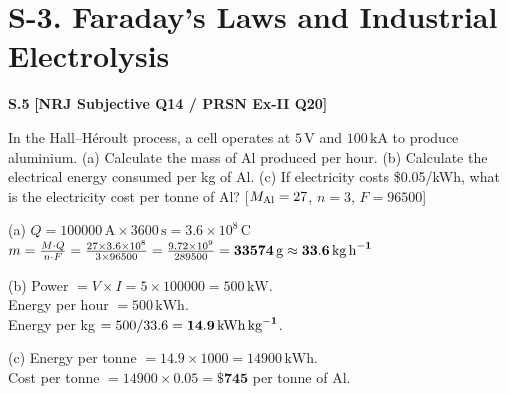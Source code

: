 \section*{S-3. Faraday's Laws and Industrial Electrolysis}

\begin{problembox}
\textbf{S.5} \hfill \textbf{[NRJ Subjective Q14 / PRSN Ex-II Q20]}

In the Hall--H\'{e}roult process, a cell operates at $5\,\text{V}$ and $100\,\text{kA}$ to produce aluminium. (a) Calculate the mass of Al produced per hour. (b) Calculate the electrical energy consumed per kg of Al. (c) If electricity costs \$0.05/kWh, what is the electricity cost per tonne of Al? [$M_{\ce{Al}} = 27$, $n=3$, $F = 96500$]
\end{problembox}
\begin{solution}
(a) $Q = 100000\,\text{A} \times 3600\,\text{s} = 3.6\times10^8\,\text{C}$\\
$m = \frac{M\cdot Q}{n\cdot F} = \frac{27\times3.6\times10^8}{3\times96500} = \frac{9.72\times10^9}{289500} = \mathbf{33574\,\text{g} \approx 33.6\,\text{kg\,h}^{-1}}$

(b) Power $= V\times I = 5\times100000 = 500\,\text{kW}$.\\
Energy per hour $= 500\,\text{kWh}$.\\
Energy per kg $= 500/33.6 = \mathbf{14.9\,\text{kWh\,kg}^{-1}}$.

(c) Energy per tonne $= 14.9\times1000 = 14900\,\text{kWh}$.\\
Cost per tonne $= 14900\times0.05 = \$\mathbf{745}$ per tonne of Al.
\end{solution}
